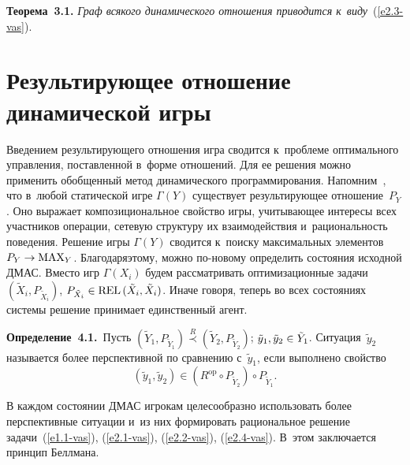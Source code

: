 \begin{multicols}{2}
    \smallskip
    
    \noindent
    \textbf{Теорема~3.1.} \textit{Граф всякого динамического отношения 
приводится к~виду}~(\ref{e2.3-vas}).

\vspace*{-6pt}

\section{Результирующее отношение динамической игры}

    Введением результирующего отношения игра сводится к~проблеме 
оптимального управ\-ле\-ния, по\-став\-лен\-ной в~форме отношений. Для ее решения\linebreak 
мож\-но применить обобщенный метод динамического программирования. 
Напомним~\cite{5-vas}, что в~любой статической игре $\Gamma(Y)$ существует 
ре\-зуль\-ти\-ру\-ющее отношение~$P_Y$. Оно выражает \mbox{композициональное} свойство 
игры, учи\-ты\-ва\-ющее интересы всех участников операции, сетевую структуру их 
взаимодействия и~ра\-ци\-о\-наль\-ность поведения. Решение игры $\Gamma(Y)$ сводится
 к~поиску максимальных элементов $P_Y\hm\to \mathrm{MAX}_Y$. Благодаря\linebreak этому, мож\-но 
по-но\-во\-му определить состояния \mbox{исходной} ДМАС. Вместо игр $\Gamma(X_i)$ 
будем рас\-смат\-ри\-вать оптимизационные задачи $(\tilde{X}_i, P_{\tilde{X}_i})$, 
$P_{\tilde{X}_i} \hm\in \mathrm{REL}\,(\tilde{X}_i, \tilde{X}_i)$. Иначе говоря, теперь во всех 
со\-сто\-яни\-ях сис\-те\-мы решение принимает единственный агент. 
    
    
    \noindent
    \textbf{Определение~4.1.}\ Пусть $(\tilde{Y}_1, P_{\tilde{Y}_1} ) 
\overset{R}{\prec} (\tilde{Y}_2, P_{\tilde{Y}_2})$; $\tilde{y}_1, \tilde{y}_2 \hm\in 
\tilde{Y}_1$. Ситуация~$\tilde{y}_2$ называется более перспективной по сравнению 
с~$\tilde{y}_1$, если выполнено свойство
    \begin{equation}
    \left( \tilde{y}_1, \tilde{y}_2\right) \in \left( R^{\mathrm{op}}\circ P_{\tilde{Y}_2} \right)\circ 
P_{\tilde{Y}_1}.
    \label{e4.1-vas}
    \end{equation}
    
    В каждом состоянии ДМАС игрокам целесообразно использовать более 
перспективные ситуации и~из них формировать рациональное решение 
задачи~(\ref{e1.1-vas}), (\ref{e2.1-vas}), (\ref{e2.2-vas}), (\ref{e2.4-vas}). В~этом 
заключается прин\-цип Бел\-лмана. 
    

\end{multicols}
